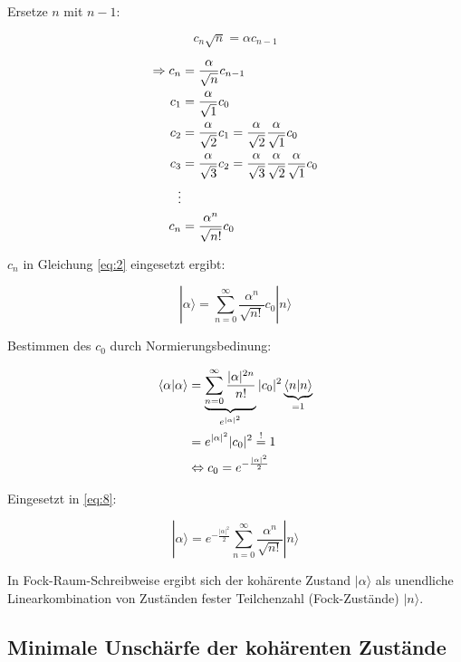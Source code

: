 Ersetze \(n\) mit \(n-1\):

\begin{equation}
  \label{eq:6}
  c_n\sqrt{n} = \alpha c_{n-1}
\end{equation}

\begin{align}
  \label{eq:7}
  \Rightarrow c_n &= \frac{\alpha}{\sqrt{n}}c_{n-1} \notag\\
c_1 &=  \frac{\alpha}{\sqrt{1}}c_{0} \notag\\
c_2 &=  \frac{\alpha}{\sqrt{2}}c_{1} =\frac{\alpha}{\sqrt{2}}\frac{\alpha}{\sqrt{1}}c_{0}  \notag \\
c_3 &=  \frac{\alpha}{\sqrt{3}}c_{2} =  \frac{\alpha}{\sqrt{3}} \frac{\alpha}{\sqrt{2}}\frac{\alpha}{\sqrt{1}}c_{0}  \notag\\
\vdots \notag\\
c_n &=  \frac{\alpha^n}{\sqrt{n!}}c_{0}
\end{align}

\(c_n\) in Gleichung \eqref{eq:2} eingesetzt ergibt:

\begin{equation}
  \label{eq:8}
  |\alpha\rangle =\sum_{n=0}^{\infty} \frac{\alpha^n}{\sqrt{n!}}c_0 |n\rangle 
\end{equation}

Bestimmen des \(c_0\) durch Normierungsbedinung:

\begin{align}
  \label{eq:9}
  \langle \alpha | \alpha \rangle  &= \underbrace{\sum_{n=0}^{\infty} \frac{|\alpha|^{2n}}{n!}}_{e^{|\alpha|^2}} |c_0|^2 \underbrace{\langle n|n\rangle}_{=1} \notag\\
&= e^{|\alpha|^2}|c_0|^2 \stackrel{!}= 1 \notag \\
 &\Leftrightarrow c_0 = e^{-\frac{|\alpha|^2}{2}} 
\end{align}

Eingesetzt in \eqref{eq:8}:

\begin{equation}
  \label{eq:10}
  \boxed{ |\alpha\rangle =  e^{-\frac{|\alpha|^2}{2}} \sum_{n=0}^{\infty} \frac{\alpha^n}{\sqrt{n!}} |n\rangle }
\end{equation}

In Fock-Raum-Schreibweise ergibt sich der kohärente Zustand \(|\alpha\rangle\) als unendliche Linearkombination von Zuständen fester Teilchenzahl (Fock-Zustände) \(|n\rangle\).


\subsection{Minimale Unschärfe der kohärenten Zustände}

